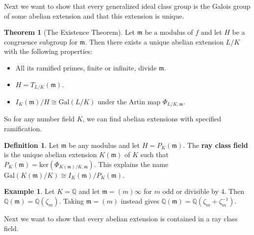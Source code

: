 \documentclass{article}
\theoremstyle{definition}
\newtheorem{theorem}{Theorem}[section]
\newtheorem{example}{Example}[section]
\newtheorem{defn}{Definition}[section]
\begin{document}
Next we want to show that every generalized ideal class group is the Galois group of some abelian extension and that this extension is unique.
\begin{theorem}[The Existence Theorem]
    Let $\mathfrak{m}$ be a modulus of $f$ and let $H$ be a congruence subgroup for $\mathfrak{m}$. Then there exists a unique abelian extension $L/K$ with the following properties:
    \begin{itemize}
        \item All its ramified primes, finite or infinite, divide $\mathfrak{m}$.
        \item $H = T_{L/K}(\mathfrak{m})$.
        \item $I_K(\mathfrak{m})/H \cong \text{Gal}(L/K)$ under the Artin map $\Phi_{L/K,\mathfrak{m}}$.
    \end{itemize}
\end{theorem}
So for any number field $K$, we can find abelian extensions with specified ramification.
\begin{defn}
    Let $\mathfrak{m}$ be any modulus and let $H = P_K(\mathfrak{m})$. The \textbf{ray class field} is the unique abelian extension $K(\mathfrak{m})$ of $K$ such that $P_K(\mathfrak{m}) = \text{ker}(\Phi_{K(\mathfrak{m})/K, \mathfrak{m}})$. This explains the name $\text{Gal}(K(\mathfrak{m})/K) \cong I_K(\mathfrak{m})/P_K(\mathfrak{m})$.
\end{defn}
\begin{example}
    Let $K=\mathbb{Q}$ and let $\mathfrak{m} = (m)\infty$ for $m$ odd or divisible by 4. Then $\mathbb{Q}(\mathfrak{m}) = \mathbb{Q}(\zeta_m)$. Taking $\mathfrak{m} = (m)$ instead gives $\mathbb{Q}(\mathfrak{m}) = \mathbb{Q}(\zeta_m + \zeta_m^{-1})$.
\end{example}
Next we want to show that every abelian extension is contained in a ray class field.
\end{document}
